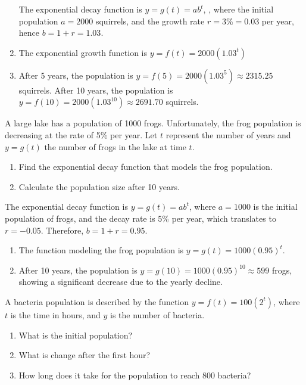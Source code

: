 \begin{solution}
    \begin{enumerate} The exponential decay function is \( y = g(t) = ab^t \), , where the initial population \( a = 2000 \) squirrels, and the growth rate \( r = 3\% = 0.03 \) per year, hence \( b = 1 + r = 1.03 \).
        \item The exponential growth function is \( y = f(t) = 2000(1.03^t) \)
        \item After 5 years, the population is \( y = f(5) = 2000(1.03^5) \approx 2315.25 \) squirrels. After 10 years, the population is \( y = f(10) = 2000(1.03^{10}) \approx 2691.70 \) squirrels.
    \end{enumerate}
\end{solution}



\begin{example}
    A large lake has a population of 1000 frogs. Unfortunately, the frog population is decreasing at the rate of 5\% per year. Let \( t \) represent the number of years and \( y = g(t) \) the number of frogs in the lake at time \( t \).
    \begin{enumerate}
        \item Find the exponential decay function that models the frog population.
        \item Calculate the population size after 10 years.
    \end{enumerate}
\end{example}

\begin{solution}
    The exponential decay function is \( y = g(t) = ab^t \), where \( a = 1000 \) is the initial population of frogs, and the decay rate is 5\% per year, which translates to \( r = -0.05 \). Therefore, \( b = 1 + r = 0.95 \).
    \begin{enumerate}
        \item The function modeling the frog population is \( y = g(t) = 1000(0.95)^t \).
        \item After 10 years, the population is \( y = g(10) = 1000(0.95)^{10} \approx 599 \) frogs, showing a significant decrease due to the yearly decline.
    \end{enumerate}
\end{solution}

\begin{example}\label{example_exponential_growth_of_bacteria}
    A bacteria population is described by the function \( y = f(t) = 100(2^t) \), where \( t \) is the time in hours, and \( y \) is the number of bacteria.
    \begin{enumerate}
        \item What is the initial population?
        \item What is change after the first hour?
        \item How long does it take for the population to reach 800 bacteria?
    \end{enumerate}
\end{example}

